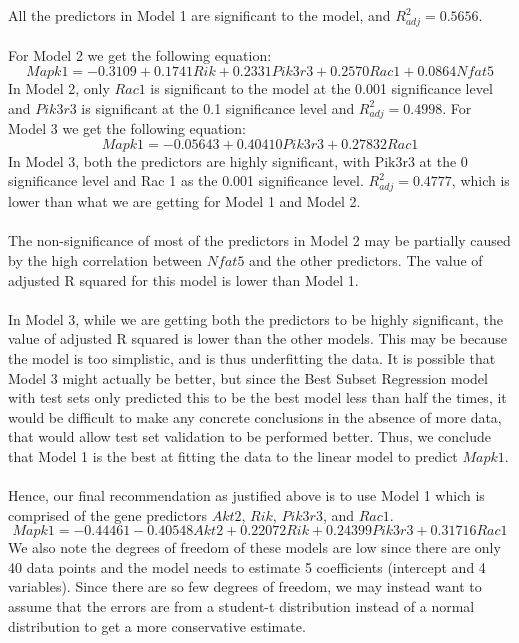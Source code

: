 \documentclass{article}
\begin{document}
All the predictors in Model 1 are significant to the model, and $R^2_{adj}=0.5656$.\\
\null\\
For Model 2 we get the following equation:
\begin{equation}
	Mapk1=-0.3109+0.1741Rik+0.2331Pik3r3+0.2570Rac1+0.0864Nfat5
	\label{eq:Model2}
\end{equation}
In Model 2, only $Rac1$ is significant to the model at the 0.001 significance level and $Pik3r3$ is significant at the 0.1 significance level and $R^2_{adj}=0.4998$.
For Model 3 we get the following equation:
\begin{equation}
	Mapk1=-0.05643+0.40410Pik3r3+0.27832Rac1
	\label{eq:Model3}
\end{equation}
In Model 3, both the predictors are highly significant, with Pik3r3 at the 0 significance level and Rac 1 as the 0.001 significance level. $R^2_{adj}=0.4777$, which is lower than what we are getting for Model 1 and Model 2. \\
\null\\
The non-significance of most of the predictors in Model 2 may be partially caused by the high correlation between $Nfat5$ and the other predictors. The value of adjusted R squared for this model is lower than Model 1.\\
\null\\
In Model 3, while we are getting both the predictors to be highly significant, the value of adjusted R squared is lower than the other models. This may be because the model is too simplistic, and is thus underfitting the data. It is possible that Model 3 might actually be better, but since the Best Subset Regression model with test sets only predicted this to be the best model less than half the times, it would be difficult to make any concrete conclusions in the absence of more data, that would allow test set validation to be performed better. Thus, we conclude that Model 1 is the best at fitting the data to the linear model to predict $Mapk1$.\\
\null\\
Hence, our final recommendation as justified above is to use Model 1 which is comprised of the gene predictors $Akt2$, $Rik$, $Pik3r3$, and $Rac1$.
\begin{equation}
	Mapk1 = -0.44461-0.40548Akt2+0.22072Rik+0.24399Pik3r3+0.31716Rac1
	\label{eq:Model1}
\end{equation}
We also note the degrees of freedom of these models are low since there are only 40 data points and the model needs to estimate 5 coefficients (intercept and 4 variables).  Since there are so few degrees of freedom, we may instead want to assume that the errors are from a student-t distribution instead of a normal distribution to get a more conservative estimate.
\end{document}
